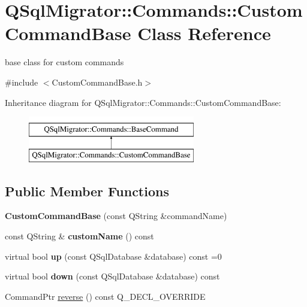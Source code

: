 \hypertarget{class_q_sql_migrator_1_1_commands_1_1_custom_command_base}{}\section{Q\+Sql\+Migrator\+:\+:Commands\+:\+:Custom\+Command\+Base Class Reference}
\label{class_q_sql_migrator_1_1_commands_1_1_custom_command_base}


base class for custom commands  




{\ttfamily \#include $<$Custom\+Command\+Base.\+h$>$}

Inheritance diagram for Q\+Sql\+Migrator\+:\+:Commands\+:\+:Custom\+Command\+Base\+:\begin{figure}[H]
\begin{center}
\leavevmode
\includegraphics[height=2.000000cm]{class_q_sql_migrator_1_1_commands_1_1_custom_command_base}
\end{center}
\end{figure}
\subsection*{Public Member Functions}
\begin{DoxyCompactItemize}
\item 
\mbox{\label{class_q_sql_migrator_1_1_commands_1_1_custom_command_base_a235261821273273feae5ae3b07eb75c0}} 
{\bfseries Custom\+Command\+Base} (const Q\+String \&command\+Name)
\item 
\mbox{\label{class_q_sql_migrator_1_1_commands_1_1_custom_command_base_a15954460a6a5ba46757089f2b7ca6e32}} 
const Q\+String \& {\bfseries custom\+Name} () const
\item 
\mbox{\label{class_q_sql_migrator_1_1_commands_1_1_custom_command_base_ac2c8521957562d3e31ca4c95d008b641}} 
virtual bool {\bfseries up} (const Q\+Sql\+Database \&database) const =0
\item 
\mbox{\label{class_q_sql_migrator_1_1_commands_1_1_custom_command_base_a76231dc0351ff7f4750a6f2411b30847}} 
virtual bool {\bfseries down} (const Q\+Sql\+Database \&database) const
\item 
Command\+Ptr \hyperlink{class_q_sql_migrator_1_1_commands_1_1_custom_command_base_a40c94f9cd360848f2c1c80b05a86ad08}{reverse} () const Q\+\_\+\+D\+E\+C\+L\+\_\+\+O\+V\+E\+R\+R\+I\+DE
\end{DoxyCompactItemize}
